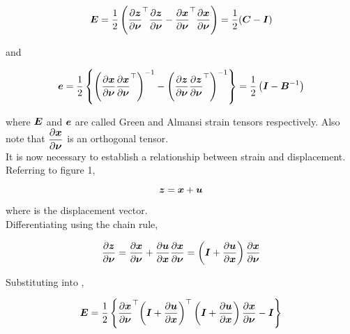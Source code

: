 \begin{equation}
  \matr{E}=\frac{1}{2}\pbrac{\transpose{\delby{\vect{z}}{\vect{\nu}}}\delby{\vect{z}}{\vect{\nu}}-
                       \transpose{\delby{\vect{x}}{\vect{\nu}}}\delby{\vect{x}}{\vect{\nu}}}=
	    \frac{1}{2}(\matr{C}-\matr{I})	       
  \label{eqn:greenstrain}
\end{equation}

\noindent and

\begin{equation}
  \vect{e}=\frac{1}{2}\bbrac{\pbrac{\delby{\vect{x}}{\vect{\nu}}\transpose{\delby{\vect{x}}{\vect{\nu}}}}^{-1}-
                             \pbrac{\delby{\vect{z}}{\vect{\nu}}\transpose{\delby{\vect{z}}{\vect{\nu}}}}^{-1}}=
			     \frac{1}{2}\pbrac{\matr{I}-\matr{B}^{-1}}  
  \label{eqn:almansistrain}
\end{equation}

\noindent where $\matr{E}$ and $\vect{e}$ are called Green and Almansi strain tensors respectively. 
Also note that $\delby{\vect{x}}{\vect{\nu}}$ is an orthogonal tensor. \\

It is now necessary to establish a relationship between strain and displacement. Referring to figure 1, 

\begin{equation}
  \vect{z}=\vect{x}+\vect{u}
  \label{eqn:displacement}
\end{equation}

\noindent where  is the displacement vector. \\

\noindent Differentiating  using the chain rule,

\begin{equation}
  \delby{\vect{z}}{\vect{\nu}}=\delby{\vect{x}}{\vect{\nu}}+\delby{\vect{u}}{\vect{x}}\delby{\vect{x}}{\vect{\nu}}=
                               \pbrac{\matr{I}+\delby{\vect{u}}{\vect{x}}}\delby{\vect{x}}{\vect{\nu}}  
  \label{eqn:displacementgradient}
\end{equation}

\noindent Substituting  into ,

\begin{equation}
  \matr{E}=\frac{1}{2}\bbrac{\transpose{\delby{\vect{x}}{\vect{\nu}}}\transpose{\pbrac{\matr{I}+\delby{\vect{u}}{\vect{x}}}}
                  \pbrac{\matr{I}+\delby{\vect{u}}{\vect{x}}}\delby{\vect{x}}{\vect{\nu}}-\matr{I}}
  \label{eqn:greendisplacement1}
\end{equation}

